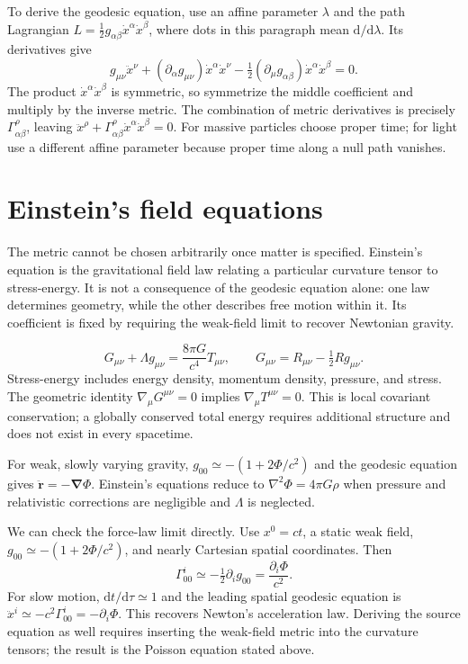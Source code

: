 \documentclass[11pt,oneside]{book}
\newcommand{\dd}{\mathrm{d}}
\newcommand{\vect}[1]{\boldsymbol{#1}}
\newcommand{\grad}{\boldsymbol{\nabla}}
\newcommand{\lap}{\nabla^2}
\theoremstyle{reviewstyle}
\begin{document}
To derive the geodesic equation, use an affine parameter $\lambda$ and the path Lagrangian $L=\tfrac12g_{\alpha\beta}\dot x^\alpha\dot x^\beta$, where dots in this paragraph mean $\dd/\dd\lambda$. Its derivatives give
\begin{equation}
g_{\mu\nu}\ddot x^\nu+
(\partial_\alpha g_{\mu\nu})\dot x^\alpha\dot x^\nu
-\tfrac12(\partial_\mu g_{\alpha\beta})\dot x^\alpha\dot x^\beta=0.
\end{equation}
The product $\dot x^\alpha\dot x^\beta$ is symmetric, so symmetrize the middle coefficient and multiply by the inverse metric. The combination of metric derivatives is precisely $\Gamma^\rho_{\alpha\beta}$, leaving $\ddot x^\rho+\Gamma^\rho_{\alpha\beta}\dot x^\alpha\dot x^\beta=0$. For massive particles choose proper time; for light use a different affine parameter because proper time along a null path vanishes.

\section{Einstein's field equations}
The metric cannot be chosen arbitrarily once matter is specified. Einstein's equation is the gravitational field law relating a particular curvature tensor to stress-energy. It is not a consequence of the geodesic equation alone: one law determines geometry, while the other describes free motion within it. Its coefficient is fixed by requiring the weak-field limit to recover Newtonian gravity.

\begin{equation}\boxed{G_{\mu\nu}+\Lambda g_{\mu\nu}=\frac{8\pi G}{c^4}T_{\mu\nu},\qquad G_{\mu\nu}=R_{\mu\nu}-\tfrac12Rg_{\mu\nu}.}\end{equation}
Stress-energy includes energy density, momentum density, pressure, and stress. The geometric identity $\nabla_\mu G^{\mu\nu}=0$ implies $\nabla_\mu T^{\mu\nu}=0$. This is local covariant conservation; a globally conserved total energy requires additional structure and does not exist in every spacetime.

For weak, slowly varying gravity, $g_{00}\simeq-(1+2\Phi/c^2)$ and the geodesic equation gives $\ddot{\vect r}=-\grad\Phi$. Einstein's equations reduce to $\lap\Phi=4\pi G\rho$ when pressure and relativistic corrections are negligible and $\Lambda$ is neglected.

We can check the force-law limit directly. Use $x^0=ct$, a static weak field, $g_{00}\simeq-(1+2\Phi/c^2)$, and nearly Cartesian spatial coordinates. Then
\begin{equation}
\Gamma^i_{00}\simeq-\tfrac12\partial_i g_{00}
=\frac{\partial_i\Phi}{c^2}.
\end{equation}
For slow motion, $\dd t/\dd\tau\simeq1$ and the leading spatial geodesic equation is $\ddot x^i\simeq-c^2\Gamma^i_{00}=-\partial_i\Phi$. This recovers Newton's acceleration law. Deriving the source equation as well requires inserting the weak-field metric into the curvature tensors; the result is the Poisson equation stated above.
\end{document}
